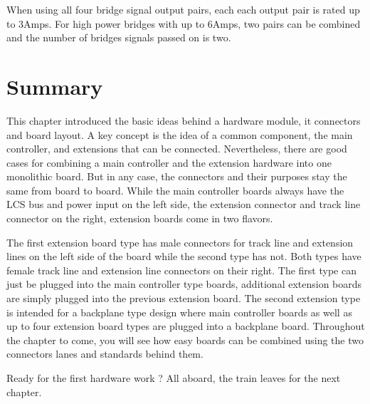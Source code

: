 When using all four bridge signal output pairs, each each output pair is rated up to 3Amps. For high power bridges with up to 6Amps, two pairs can be combined and the number of bridges signals passed on is two.

\section{Summary}

This chapter introduced the basic ideas behind a hardware module, it connectors and board layout. A key concept is the idea of a common component, the main controller, and extensions that can be connected. Nevertheless, there are good cases for combining a main controller and the extension hardware into one monolithic board. But in any case, the connectors and their purposes stay the same from board to board. While the main controller boards always have the LCS bus and power input on the left side, the extension connector and track line connector on the right, extension boards come in two flavors. 

The first extension board type has male connectors for track line and extension lines on the left side of the board while the second type has not. Both types have female track line and extension line connectors on their right. The first type can just be plugged into the main controller type boards, additional extension boards are simply plugged into the previous extension board. The second extension type is intended for a backplane type design where main controller boards as well as up to four extension board types are plugged into a backplane board. Throughout the chapter to come, you will see how easy boards can be combined using the two connectors lanes and standards behind them. 

Ready for the first hardware work ? All aboard, the train leaves for the next chapter.

